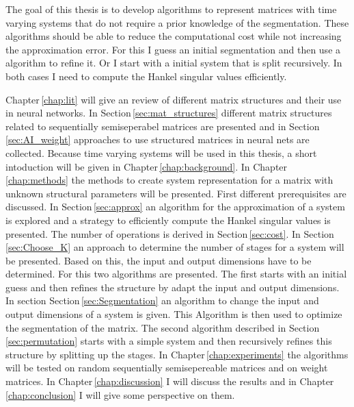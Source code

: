 \documentclass[doctype=mastersthesis,BCOR=15mm,biblatex]{ldvbook}%
\begin{document}
The goal of this thesis is to develop algorithms to represent matrices with time varying systems that do not require a prior knowledge of the segmentation.
These algorithms should be able to reduce the computational cost while not increasing the approximation error.
For this I guess an initial segmentation and then use a algorithm to refine it.
Or I start with a initial system that is split recursively.
In both cases I need to compute the Hankel singular values efficiently.


Chapter\,\ref{chap:lit} will give an review of different matrix structures and their use in neural networks.
In Section\,\ref{sec:mat_structures} different matrix structures related to sequentially semiseperabel matrices are presented
and in Section\,\ref{sec:AI_weight} approaches to use structured matrices in neural nets are collected.
Because time varying systems will be used in this thesis, a short intoduction will be given in Chapter\,\ref{chap:background}.
In Chapter\,\ref{chap:methods} the methods to create system representation for a matrix with unknown structural parameters will be presented.
First different prerequisites are discussed.
In Section\,\ref{sec:approx} an algorithm for the approximation of a system is explored
 and a strategy to efficiently compute the Hankel singular values is presented.
The number of operations is derived in Section\,\ref{sec:cost}.
In Section\,\ref{sec:Choose_K} an approach to determine the number of stages for a system will be presented.
Based on this, the input and output dimensions have to be  determined.
For this two algorithms are presented.
The first starts with an initial guess and then refines the structure by adapt the input and output dimensions.
In section Section\,\ref{sec:Segmentation} an algorithm to change the input and output dimensions of a system is given.
This Algorithm is then used to optimize the segmentation of the matrix.
The second algorithm described in Section\,\ref{sec:permutation} starts with a simple system and then recursively refines this structure by splitting up the stages.
In Chapter\,\ref{chap:experiments} the algorithms will be tested on random sequentially semisepereable matrices and on weight matrices.
In Chapter\,\ref{chap:discussion} I will discuss the results and in Chapter\,\ref{chap:conclusion} I will give some perspective on them.
\end{document}
